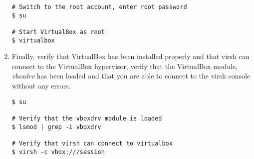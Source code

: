 \begin{enumerate}
\lstset{language=bash,caption=Always Start VirtualBox as Root}
\begin{lstlisting}
# Switch to the root account, enter root password
$ su

# Start VirtualBox as root
$ virtualbox
\end{lstlisting}

\item	Finally, verify that VirtualBox has been installed properly and that virsh can connect to the VirtualBox hypervisor, 
		verify that the VirtualBox module, \emph{vboxdrv} has been loaded and that you are able to connect to the virsh console 
		without any errors.

\lstset{language=bash,caption=Verify that virsh can Access VirtualBox}
\begin{lstlisting}
$ su

# Verify that the vboxdrv module is loaded
$ lsmod | grep -i vboxdrv

# Verify that virsh can connect to virtualbox
$ virsh -c vbox:///session
\end{lstlisting}
\end{enumerate}





